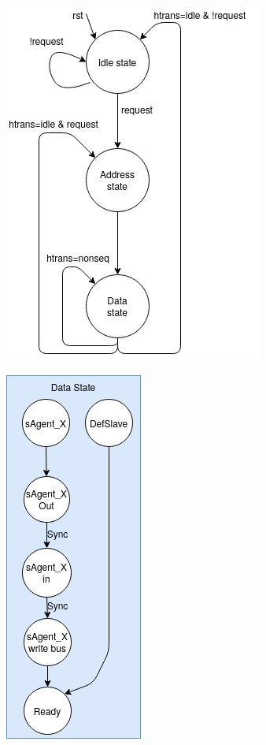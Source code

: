 \begin{figure}[ht!]
	\centering
	\begin{minipage}[t]{0.49\textwidth}
		\centering
		\includegraphics[scale=0.5]{figs/ESL/Bus_fsm_new.png}
		\label{fig:OC}
	\end{minipage}
	\begin{minipage}[t]{0.49\textwidth}
		\centering
		\includegraphics[scale=0.5]{figs/ESL/Data_state.png}
		\label{fig:eslfsm}
	\end{minipage}
\end{figure}

